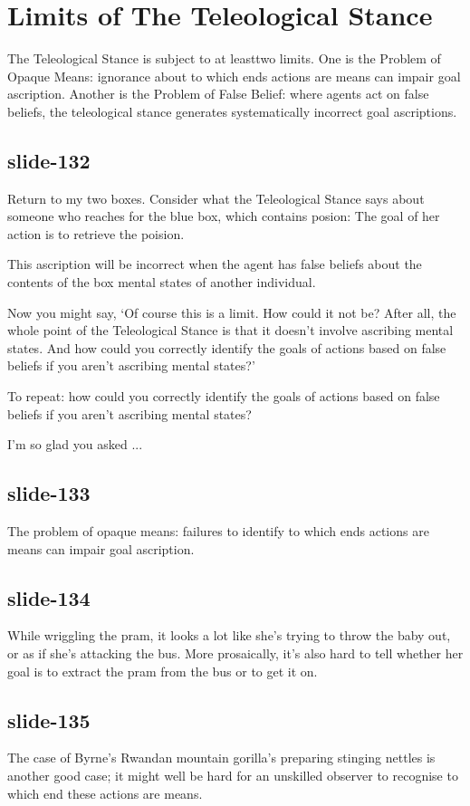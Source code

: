 \documentclass[12pt,\papersize]{extarticle}
\begin{document}
\section{Limits of The Teleological Stance}

The Teleological Stance is subject to at leasttwo limits.
One is the Problem of Opaque Means:
ignorance about to which ends actions are means can impair goal ascription.
Another is the Problem of False Belief:
where agents act on false beliefs, the teleological stance generates
systematically incorrect goal ascriptions.

\subsection{slide-132}
Return to my two boxes.
Consider what the Teleological Stance says about someone who
reaches for the blue box, which contains posion:
The goal of her action is to retrieve the poision.

This ascription will be incorrect when the agent
has false beliefs about the contents of the box
mental states of another individual.

Now you might say, ‘Of course this is a limit.  How could it not be?
After all, the whole point of the Teleological Stance is that it doesn’t
involve ascribing mental states.  And how could you correctly identify the
goals of actions based on false beliefs if you aren’t ascribing mental states?’

To repeat: how could you correctly identify the
goals of actions based on false beliefs if you aren’t ascribing mental states?

I’m so glad you asked ...

\subsection{slide-133}
The problem of opaque means:
failures to identify to which ends actions are means can impair goal ascription.

\subsection{slide-134}
While wriggling the pram, it looks a lot like she’s trying to throw
the baby out, or as if she’s attacking the bus.
More prosaically, it’s also hard to tell whether her goal is to
extract the pram from the bus or to get it on.

\subsection{slide-135}
The case of Byrne’s Rwandan mountain gorilla’s preparing stinging nettles
is another good case; it might well be hard for an unskilled
observer to recognise to which end these actions are means.
\end{document}
